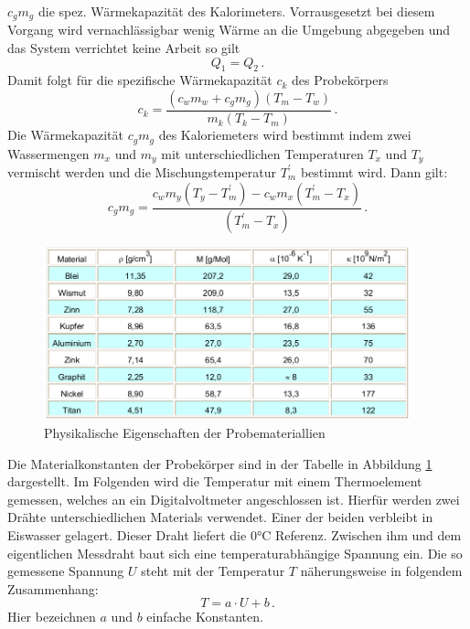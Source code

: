 $c_gm_g$ die spez. Wärmekapazität des Kalorimeters.
Vorrausgesetzt bei diesem Vorgang wird vernachlässigbar wenig Wärme an die
Umgebung abgegeben und das System verrichtet keine Arbeit so gilt
\begin{equation*}
  Q_1 = Q_2 \, .
\end{equation*}
Damit folgt für die spezifische Wärmekapazität $c_k$ des Probekörpers
\begin{equation}
  c_k = \frac{(c_w m_w + c_g m_g)(T_m - T_w)}{m_k ( T_k - T_m)}\, .
  \label{eqn:ck}
\end{equation}
Die Wärmekapazität $c_g m_g$ des Kaloriemeters wird bestimmt indem zwei
Wassermengen $ m_x $ und $m_y$ mit unterschiedlichen Temperaturen $T_x$ und
$T_y$ vermischt werden und die Mischungstemperatur $T_m ^{'}$ bestimmt wird.
Dann gilt:
\begin{equation}
  c_gm_g = \frac{c_w m_y (T_y - T_m ^{'})- c_w m_x (T_m ^{'} - T_x)}{(T_m ^{'} - T_x)} \, .
  \label{eqn:cgmg}
\end{equation}
\begin{figure}
  \centering
  \includegraphics[height=5cm]{logos/tab.png}
  \caption{Physikalische Eigenschaften der Probemateriallien \cite{Anleitung}}
  \label{fig:tab}
\end{figure}
Die Materialkonstanten der Probekörper sind in der Tabelle in
Abbildung \ref{fig:tab} dargestellt.
Im Folgenden wird die Temperatur mit einem Thermoelement gemessen, welches
an ein Digitalvoltmeter angeschlossen ist. Hierfür werden zwei Drähte unterschiedlichen Materials verwendet. Einer der beiden verbleibt in Eiswasser gelagert. Dieser Draht liefert die $0 \si{\celsius}$ Referenz. Zwischen ihm und dem eigentlichen Messdraht baut sich eine temperaturabhängige Spannung ein. Die so gemessene Spannung $U$
steht mit der Temperatur $T$ näherungsweise in folgendem Zusammenhang:
\begin{equation}
  T = a\cdot U + b \,.
  \label{eqn:TU}
\end{equation}
Hier bezeichnen $ a $ und $b$ einfache Konstanten.


























%
